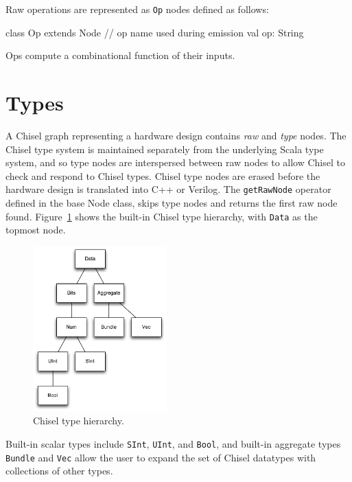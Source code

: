 \documentclass[10pt,twocolumn]{article}
\def\code#1{{\small\tt #1}}
\begin{document}
Raw operations are represented as \code{Op} nodes defined as follows:

\begin{scala}
class Op extends Node {
  // op name used during emission
  val op: String
}
\end{scala}

\noindent
Ops compute a combinational function of their inputs.

\section{Types}
\label{sec:types}

A Chisel graph representing a hardware design contains {\em raw} and
{\em type} nodes.  The Chisel type system is maintained separately
from the underlying Scala type system, and so type nodes are
interspersed between raw nodes to allow Chisel to check and respond to
Chisel types.  Chisel type nodes are erased before the hardware design
is translated into C++ or Verilog.  The \code{getRawNode} operator
defined in the base Node class, skips type nodes and returns the first
raw node found.  Figure~\ref{fig:type-hierarchy} shows the built-in
Chisel type hierarchy, with \code{Data} as the topmost node.

\begin{figure}[h]
\centering
\includegraphics[height=2.5in]{figs/type-hierarchy.pdf}
\caption{Chisel type hierarchy.}
\label{fig:type-hierarchy}
\end{figure}

\noindent
Built-in scalar types include \code{SInt},
\code{UInt}, and \code{Bool}, and built-in aggregate types \code{Bundle} and
\code{Vec} allow the user to expand the set of Chisel datatypes with
collections of other types.
\end{document}
